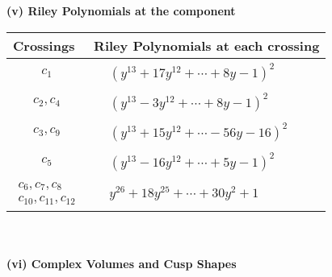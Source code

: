 \documentclass[1p]{elsarticle_modified}
\theoremstyle{definition}
\begin{document}
\newpage\renewcommand{\arraystretch}{1}
\flushleft \textbf{(v) Riley Polynomials at the component}\newline \\
\begin{tabular}{m{50pt}|m{274pt}}
Crossings & \hspace{64pt}Riley Polynomials at each crossing \\
\hline $$\begin{aligned}c_{1}\end{aligned}$$&$\begin{aligned}
&(y^{13}+17 y^{12}+\cdots+8 y-1)^{2}
\end{aligned}$\\
\hline $$\begin{aligned}c_{2},c_{4}\end{aligned}$$&$\begin{aligned}
&(y^{13}-3 y^{12}+\cdots+8 y-1)^{2}
\end{aligned}$\\
\hline $$\begin{aligned}c_{3},c_{9}\end{aligned}$$&$\begin{aligned}
&(y^{13}+15 y^{12}+\cdots-56 y-16)^{2}
\end{aligned}$\\
\hline $$\begin{aligned}c_{5}\end{aligned}$$&$\begin{aligned}
&(y^{13}-16 y^{12}+\cdots+5 y-1)^{2}
\end{aligned}$\\
\hline $$\begin{aligned}c_{6},c_{7},c_{8}\\c_{10},c_{11},c_{12}\end{aligned}$$&$\begin{aligned}
&y^{26}+18 y^{25}+\cdots+30 y^2+1
\end{aligned}$\\
\hline
\end{tabular}\\~\\
\newpage\flushleft \textbf{(vi) Complex Volumes and Cusp Shapes}
\end{document}
